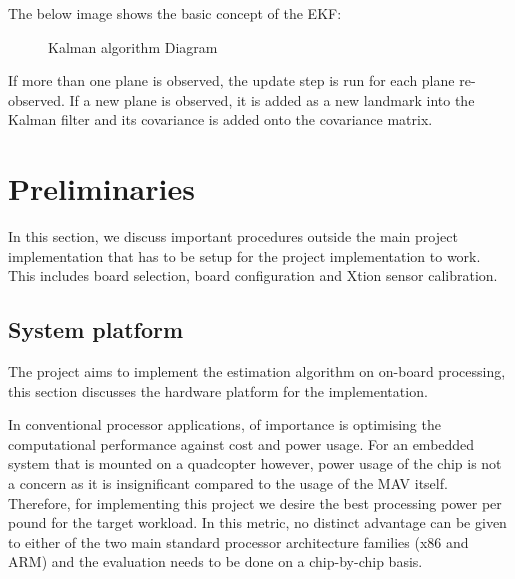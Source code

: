 \documentclass[]{article}
\begin{document}
{The below image shows the basic concept of the EKF:
\begin{figure}[H]
\centering     %
{} \;
\caption{Kalman algorithm Diagram}
\end{figure}

If more than one plane is observed, the update step is run for each plane re-observed. If a new plane is observed, it is added as a new landmark into the Kalman filter and its covariance is added onto the covariance matrix.

\section{Preliminaries}
In this section, we discuss important procedures outside the main project implementation that has to be setup for the project implementation to work. This includes board selection, board configuration and Xtion sensor calibration. 

\subsection{System platform} %
\label{sub:system_platform}

The project aims to implement the estimation algorithm on on-board processing, this section discusses the hardware platform for the implementation.

In conventional processor applications, of importance is optimising the computational performance against cost and power usage. For an embedded system that is mounted on a quadcopter however, power usage of the chip is not a concern as it is insignificant compared to the usage of the MAV itself. Therefore, for implementing this project we desire the best processing power per pound for the target workload. In this metric, no distinct advantage can be given to either of the two main standard processor architecture families (x86 and ARM) and the evaluation needs to be done on a chip-by-chip basis. 

}
\end{document}
